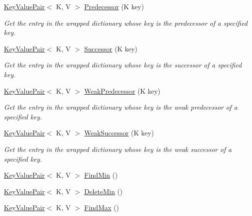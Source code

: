 \begin{DoxyCompactItemize}
\hyperlink{struct_c5_1_1_key_value_pair}{Key\+Value\+Pair}$<$ K, V $>$ \hyperlink{class_c5_1_1_guarded_sorted_dictionary_acf0256db1171ea679bb41ab88ababb23}{Predecessor} (K key)
\begin{DoxyCompactList}\small\item\em Get the entry in the wrapped dictionary whose key is the predecessor of a specified key. \end{DoxyCompactList}\item 
\hyperlink{struct_c5_1_1_key_value_pair}{Key\+Value\+Pair}$<$ K, V $>$ \hyperlink{class_c5_1_1_guarded_sorted_dictionary_ae112e4910e7e5f66482eb1a4445985c4}{Successor} (K key)
\begin{DoxyCompactList}\small\item\em Get the entry in the wrapped dictionary whose key is the successor of a specified key. \end{DoxyCompactList}\item 
\hyperlink{struct_c5_1_1_key_value_pair}{Key\+Value\+Pair}$<$ K, V $>$ \hyperlink{class_c5_1_1_guarded_sorted_dictionary_ad6d9c3358a0134cfb62866450a8a5e9a}{Weak\+Predecessor} (K key)
\begin{DoxyCompactList}\small\item\em Get the entry in the wrapped dictionary whose key is the weak predecessor of a specified key. \end{DoxyCompactList}\item 
\hyperlink{struct_c5_1_1_key_value_pair}{Key\+Value\+Pair}$<$ K, V $>$ \hyperlink{class_c5_1_1_guarded_sorted_dictionary_a3f90c53ece049565c81ec4679408189c}{Weak\+Successor} (K key)
\begin{DoxyCompactList}\small\item\em Get the entry in the wrapped dictionary whose key is the weak successor of a specified key. \end{DoxyCompactList}\item 
\hyperlink{struct_c5_1_1_key_value_pair}{Key\+Value\+Pair}$<$ K, V $>$ \hyperlink{class_c5_1_1_guarded_sorted_dictionary_a54ad8ab10783fb8a232cce502ef1ff60}{Find\+Min} ()
\item 
\hyperlink{struct_c5_1_1_key_value_pair}{Key\+Value\+Pair}$<$ K, V $>$ \hyperlink{class_c5_1_1_guarded_sorted_dictionary_a481cd0c7a47183de271df37fbbc6309f}{Delete\+Min} ()
\item 
\hyperlink{struct_c5_1_1_key_value_pair}{Key\+Value\+Pair}$<$ K, V $>$ \hyperlink{class_c5_1_1_guarded_sorted_dictionary_ad891d10d9fd40b6e1f4e7a855e65f3f4}{Find\+Max} ()
\item 

\end{DoxyCompactItemize}

